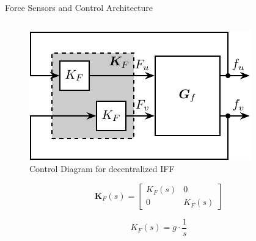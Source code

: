 \documentclass[t, minted]{clean-beamer}
\begin{document}
\begin{frame}[label={sec:org6faf2d3}]{Force Sensors and Control Architecture}
\begin{columns}
\begin{column}{0.4\columnwidth}
\begin{figure}[htbp]
\centering
\includegraphics[width=\linewidth]{figs/control_diagram_iff.pdf}
\caption{Control Diagram for decentralized IFF}
\end{figure}

\begin{equation*}
  \bm{K}_F(s) = \begin{bmatrix} K_F(s) & 0 \\ 0 & K_F(s) \end{bmatrix}
\end{equation*}

\begin{equation*}
  K_F(s) = g \cdot \frac{1}{s}
\end{equation*}
\end{column}
\end{columns}
\end{frame}
\end{document}
